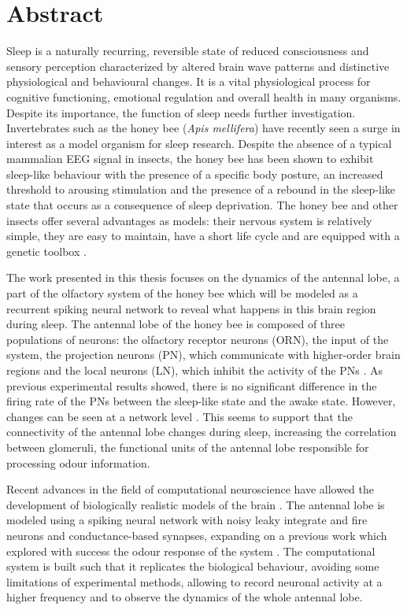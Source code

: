 \graphicspath{{chapters/01_abstract}}
\chapter*{Abstract}

Sleep is a naturally recurring, reversible state of reduced consciousness and sensory perception characterized by altered brain wave patterns and distinctive physiological and behavioural changes.
It is a vital physiological process for cognitive functioning, emotional regulation and overall health in many organisms.
Despite its importance, the function of sleep needs further investigation.
Invertebrates such as the honey bee (\textit{Apis mellifera}) have recently seen a surge in interest as a model organism for sleep research.
Despite the absence of a typical mammalian EEG signal in insects, the honey bee has been shown to exhibit sleep-like behaviour with the presence of a specific body posture, an increased threshold to arousing stimulation and the presence of a rebound in the sleep-like state that occurs as a consequence of sleep deprivation.
The honey bee and other insects offer several advantages as models: their nervous system is relatively simple, they are easy to maintain, have a short life cycle and are equipped with a genetic toolbox \cite{sleep-mammals}.

The work presented in this thesis focuses on the dynamics of the antennal lobe, a part of the olfactory system of the honey bee which will be modeled as a recurrent spiking neural network to reveal what happens in this brain region during sleep.
The antennal lobe of the honey bee is composed of three populations of neurons: the olfactory receptor neurons (ORN), the input of the system, the projection neurons (PN), which communicate with higher-order brain regions and the local neurons (LN), which inhibit the activity of the PNs \cite{olfactory-coding-honeybee}.
As previous experimental results showed, there is no significant difference in the firing rate of the PNs between the sleep-like state and the awake state.
However, changes can be seen at a network level \cite{sleep-correlates}.
This seems to support that the connectivity of the antennal lobe changes during sleep, increasing the correlation between glomeruli, the functional units of the antennal lobe responsible for processing odour information.

Recent advances in the field of computational neuroscience have allowed the development of biologically realistic models of the brain \cite{deep-learning-in-neuroscience}.
The antennal lobe is modeled using a spiking neural network \cite{snn-review} with noisy leaky integrate and fire neurons \cite{lif-review} and conductance-based synapses, expanding on a previous work which explored with success the odour response of the system \cite{bee-geosmin}.
The computational system is built such that it replicates the biological behaviour, avoiding some limitations of experimental methods, allowing to record neuronal activity at a higher frequency and to observe the dynamics of the whole antennal lobe.

